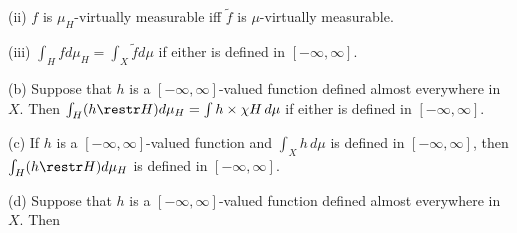 \quad(ii) $f$ is $\mu_H$-virtually measurable iff $\tilde f$ is
$\mu$-virtually measurable.

\quad(iii) $\int_Hfd\mu_H=\int_X\tilde fd\mu$ if either is
defined in $[-\infty,\infty]$.

(b) Suppose that $h$ is a $[-\infty,\infty]$-valued function defined almost
everywhere in $X$.   Then
$\int_H(h\restr H)d\mu_H=\int h\times\chi H\,d\mu$ if either is defined in
$[-\infty,\infty]$.

(c) If $h$ is a $[-\infty,\infty]$-valued function and $\int_Xh\,d\mu$ is
defined in $[-\infty,\infty]$, then $\int_H(h\restr H)d\mu_H$ is defined in
$[-\infty,\infty]$.

(d) Suppose that $h$ is a $[-\infty,\infty]$-valued function defined almost
everywhere in $X$.   Then


